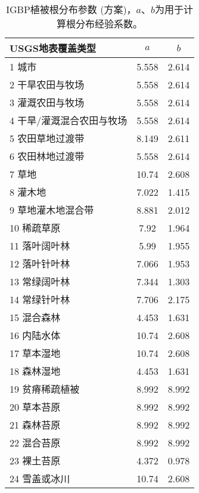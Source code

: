 \begin{table}[]
\centering
\caption{IGBP植被根分布参数 (\citet{zeng2001global}方案)，$a$、$b$为用于计算根分布经验系数。}
\label{tab:IGBP植被根分布参数}
\begin{tabular}{@{}lcc@{}}
\toprule
USGS地表覆盖类型     & $a$ & $b$ \\ \midrule
1 城市           & 5.558      & 2.614      \\
2 干旱农田与牧场      & 5.558      & 2.614      \\
3 灌溉农田与牧场      & 5.558      & 2.614      \\
4 干旱/灌溉混合农田与牧场 & 5.558      & 2.614      \\
5 农田草地过渡带      & 8.149      & 2.611      \\
6 农田林地过渡带      & 5.558      & 2.614      \\
7 草地           & 10.74      & 2.608      \\
8 灌木地          & 7.022      & 1.415      \\
9 草地灌木地混合带     & 8.881      & 2.012      \\
10 稀疏草原        & 7.92       & 1.964      \\
11 落叶阔叶林       & 5.99       & 1.955      \\
12 落叶针叶林       & 7.066      & 1.953      \\
13 常绿阔叶林       & 7.344      & 1.303      \\
14 常绿针叶林       & 7.706      & 2.175      \\
15 混合森林        & 4.453      & 1.631      \\
16 内陆水体        & 10.74      & 2.608      \\
17 草本湿地        & 10.74      & 2.608      \\
18 森林湿地        & 4.453      & 1.631      \\
19 贫瘠稀疏植被      & 8.992      & 8.992      \\
20 草本苔原        & 8.992      & 8.992      \\
21 森林苔原        & 8.992      & 8.992      \\
22 混合苔原        & 8.992      & 8.992      \\
23 裸土苔原        & 4.372      & 0.978      \\
24 雪盖或冰川       & 10.74      & 2.608      \\ \bottomrule
\end{tabular}
\end{table}

